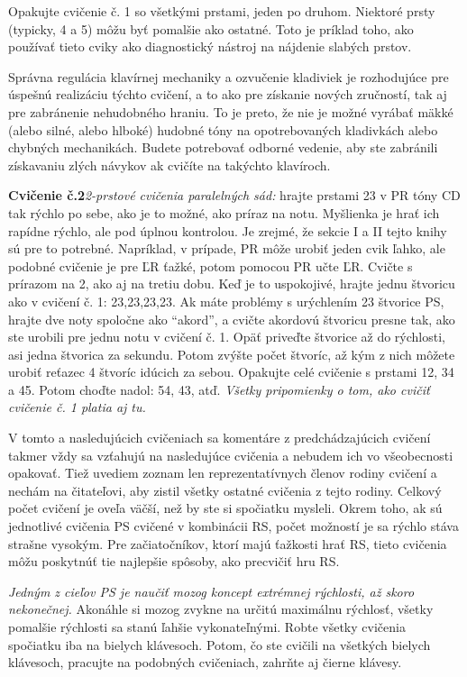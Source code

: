 Opakujte cvičenie č. 1 so všetkými prstami, jeden po druhom. Niektoré prsty (typicky, 4 a 5) môžu byť pomalšie ako ostatné. Toto je príklad toho, ako používať tieto cviky ako diagnostický nástroj na nájdenie slabých prstov.

Správna regulácia klavírnej mechaniky a ozvučenie kladiviek je rozhodujúce pre úspešnú realizáciu týchto cvičení, a to ako pre získanie nových zručností, tak aj pre zabránenie nehudobného hraniu. To je preto, že nie je možné vyrábať mäkké (alebo silné, alebo hlboké) hudobné tóny na opotrebovaných kladivkách alebo chybných mechanikách. Budete potrebovať odborné vedenie, aby ste zabránili získavaniu zlých návykov ak cvičíte na takýchto klavíroch.

\textbf{Cvičenie č.2}\enspace \emph{2-prstové cvičenia paralelných sád:} hrajte prstami 23 v PR tóny CD tak rýchlo po sebe, ako je to možné, ako príraz na notu. Myšlienka je hrať ich rapídne rýchlo, ale pod úplnou kontrolou. Je zrejmé, že sekcie I\cite{} a II\cite{} tejto knihy sú pre to potrebné. Napríklad, v prípade, PR môže urobiť jeden cvik ľahko, ale podobné cvičenie je pre ĽR ťažké, potom pomocou PR učte ĽR. Cvičte s prírazom na 2, ako aj na tretiu dobu. Keď je to uspokojivé, hrajte jednu štvoricu ako v cvičení č. 1: 23,23,23,23. Ak máte problémy s urýchlením 23 štvorice PS, hrajte dve noty spoločne ako “akord”, a cvičte akordovú štvoricu presne tak, ako ste urobili pre jednu notu v cvičení č. 1. Opäť priveďte štvorice až do rýchlosti, asi jedna štvorica za sekundu. Potom zvýšte počet štvoríc, až kým z nich môžete urobiť reťazec 4 štvoríc idúcich za sebou. Opakujte celé cvičenie s prstami 12, 34 a 45. Potom choďte nadol: 54, 43, atď. \emph{Všetky pripomienky o tom, ako cvičiť cvičenie č. 1 platia aj tu.}

V tomto a nasledujúcich cvičeniach sa komentáre z predchádzajúcich cvičení takmer vždy sa vzťahujú na nasledujúce cvičenia a nebudem ich vo všeobecnosti opakovať. Tiež uvediem zoznam len reprezentatívnych členov rodiny cvičení a nechám na čitateľovi, aby zistil všetky ostatné cvičenia z tejto rodiny. Celkový počet cvičení je oveľa väčší, než by ste si spočiatku mysleli. Okrem toho, ak sú jednotlivé cvičenia PS cvičené v kombinácii RS, počet možností je sa rýchlo stáva strašne vysokým. Pre začiatočníkov, ktorí majú ťažkosti hrať RS, tieto cvičenia môžu poskytnúť tie najlepšie spôsoby, ako precvičiť hru RS.

\NeedRevision{}\emph{Jedným z cieľov PS je naučiť mozog koncept extrémnej rýchlosti, až skoro nekonečnej.} Akonáhle si mozog zvykne na určitú maximálnu rýchlosť, všetky pomalšie rýchlosti sa stanú ľahšie vykonateľnými. Robte všetky cvičenia spočiatku iba na bielych klávesoch. Potom, čo ste cvičili na všetkých bielych klávesoch, pracujte na podobných cvičeniach, zahrňte aj čierne klávesy.

